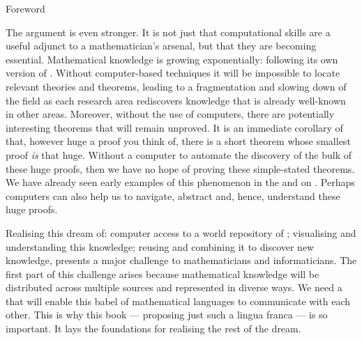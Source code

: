 \begin{omgroup}{Foreword}
\begin{omtext}
The argument is even stronger. It is not just that computational skills are a useful
adjunct to a mathematician's arsenal, but that they are becoming essential. Mathematical
knowledge is growing exponentially: following its own version of {}.
Without computer-based {} techniques it will be impossible
to locate relevant theories and theorems, leading to a fragmentation and slowing down of
the field as each research area rediscovers knowledge that is already well-known in other
areas. Moreover, without the use of computers, there are potentially interesting theorems
that will remain unproved. It is an immediate corollary of
{} that, however huge a proof you think of,
there is a short theorem whose smallest proof {\emph{is}} that huge.  Without a computer
to automate the discovery of the bulk of these huge proofs, then we have no hope of
proving these simple-stated theorems.  We have already seen early examples of this
phenomenon in the {} and {} on
{}.  Perhaps computers can also help us to navigate, abstract
and, hence, understand these huge proofs.
\end{omtext}

\begin{omtext}
Realising this dream of: computer access to a world repository of
{}; visualising and understanding this knowledge; reusing
and combining it to discover new knowledge, presents a major challenge to mathematicians
and informaticians.  The first part of this challenge arises because mathematical
knowledge will be distributed across multiple sources and represented in diverse ways. We
need a {} that will enable this babel of mathematical languages to
communicate with each other. This is why this book --- proposing just such a lingua franca
--- is so important. It lays the foundations for realising the rest of the dream.
\end{omtext}


\end{omgroup}
